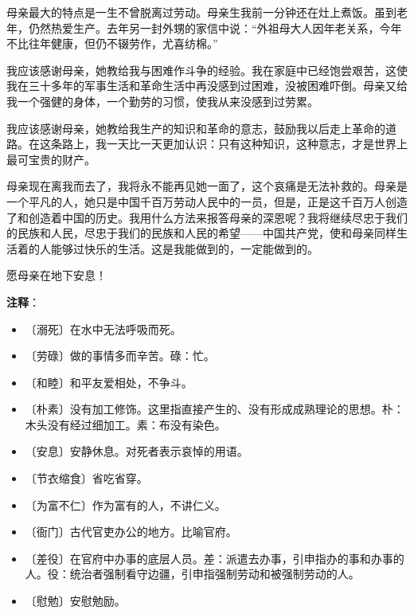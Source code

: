 \documentclass[12pt,UTF-8,openany]{ctexbook}
\begin{document}
\begin{large}
    母亲最大的特点是一生不曾脱离过劳动。母亲生我前一分钟还在灶上煮饭。虽到老年，仍然热爱生产。去年另一封外甥的家信中说：“外祖母大人因年老关系，今年不比往年健康，但仍不辍劳作，尤喜纺棉。”
    
    我应该感谢母亲，她教给我与困难作斗争的经验。我在家庭中已经饱尝艰苦，这使我在三十多年的军事生活和革命生活中再没感到过困难，没被困难吓倒。母亲又给我一个强健的身体，一个勤劳的习惯，使我从来没感到过劳累。
    
    我应该感谢母亲，她教给我生产的知识和革命的意志，鼓励我以后走上革命的道路。在这条路上，我一天比一天更加认识：只有这种知识，这种意志，才是世界上最可宝贵的财产。
    
    母亲现在离我而去了，我将永不能再见她一面了，这个哀痛是无法补救的。母亲是一个平凡的人，她只是中国千百万劳动人民中的一员，但是，正是这千百万人创造了和创造着中国的历史。我用什么方法来报答母亲的深恩呢？我将继续尽忠于我们的民族和人民，尽忠于我们的民族和人民的希望——中国共产党，使和母亲同样生活着的人能够过快乐的生活。这是我能做到的，一定能做到的。
    
    愿母亲在地下安息！
    
\end{large}


\newpage

\textbf{注释}：

\vspace{-1em}

\begin{itemize}
    \setlength\itemsep{-0.2em}
    \item 〔溺死〕在水中无法呼吸而死。
    \item 〔劳碌〕做的事情多而辛苦。碌：忙。
    \item 〔和睦〕和平友爱相处，不争斗。
    \item 〔朴素〕没有加工修饰。这里指直接产生的、没有形成成熟理论的思想。朴：木头没有经过细加工。素：布没有染色。
    \item 〔安息〕安静休息。对死者表示哀悼的用语。
    \item 〔节衣缩食〕省吃省穿。
    \item 〔为富不仁〕作为富有的人，不讲仁义。
    \item 〔衙门〕古代官吏办公的地方。比喻官府。
    \item 〔差役〕在官府中办事的底层人员。差：派遣去办事，引申指办的事和办事的人。役：统治者强制看守边疆，引申指强制劳动和被强制劳动的人。
    \item 〔慰勉〕安慰勉励。
\end{itemize}
\end{document}
